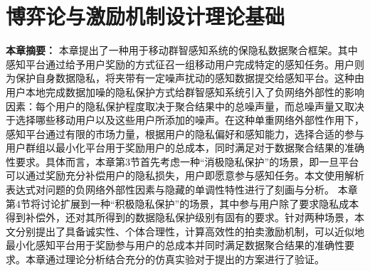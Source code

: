 \chapter{博弈论与激励机制设计理论基础}

\textbf{本章摘要：} 
本章提出了一种用于移动群智感知系统的保隐私数据聚合框架。其中感知平台通过给予用户奖励的方式征召一组移动用户完成特定的感知任务。用户则为保护自身数据隐私，将夹带有一定噪声扰动的感知数据提交给感知平台。这种由用户本地完成数据加噪的隐私保护方式给群智感知系统引入了{\kaishu 负网络外部性}的影响因素：每个用户的隐私保护程度取决于聚合结果中的总噪声量，而总噪声量又取决于选择哪些移动用户以及这些用户所添加的噪声。在这种{\kaishu 单重}网络外部性作用下，感知平台通过有限的市场力量，根据用户的隐私偏好和感知能力，选择合适的参与用户群组以最小化平台用于奖励用户的总成本，同时满足对于数据聚合结果的准确性要求。具体而言，本章第3节首先考虑一种“消极隐私保护”的场景，即一旦平台可以通过奖励充分补偿用户的隐私损失，用户即愿意参与感知任务。本文使用解析表达式对问题的负网络外部性因素与隐藏的单调性特性进行了刻画与分析。
本章第4节将讨论扩展到一种“积极隐私保护”的场景，其中参与用户除了要求隐私成本得到补偿外，还对其所得到的数据隐私保护级别有固有的要求。针对两种场景，本文分别提出了具备诚实性、个体合理性，计算高效性的拍卖激励机制，可以近似地最小化感知平台用于奖励参与用户的总成本并同时满足数据聚合结果的准确性要求。本章通过理论分析结合充分的仿真实验对于提出的方案进行了验证。


